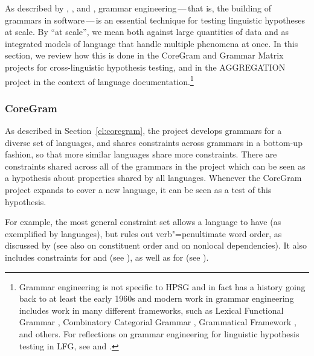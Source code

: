 \documentclass[output=paper
	        ,collection
	        ,collectionchapter
 	        ,biblatex
                ,babelshorthands
                ,newtxmath
                ,draftmode
                ,colorlinks, citecolor=brown
]{langscibook}
\begin{document}

As described by \citet[]{Mueller99a}, \citet{Bender2008c}, and \citet{BFO2011a-u},
grammar engineering\,---\,that is, the building of grammars in software\,---\,is
an essential technique for testing linguistic hypotheses at scale. By
``at scale'', we mean both against large quantities of data and as
integrated models of language that handle multiple phenomena at
once. In this section, we review how this is done in the CoreGram
and Grammar Matrix projects for cross-linguistic hypothesis testing,
and in the AGGREGATION project in the context of language
documentation.\footnote{Grammar engineering is not specific to HPSG and
in fact has a history going back to at least the early 1960s \citep{Kay:63,ZFHW65a,Petrick65a-u,FBDPM71a-u}
and modern work in grammar engineering includes work in many different frameworks, such as Lexical Functional Grammar \citep{BKNS99a-ed}, Combinatory Categorial
Grammar \citep{BCPW2007a}, Grammatical Framework \citep{Ranta:09}, and others.
For reflections on grammar engineering for linguistic hypothesis testing
in LFG, see \citet{BKNS99a-ed} and \citet{King:16}.}



\subsubsection{CoreGram}
\label{cl:lang-doc:coregram}

As described in Section~\ref{cl:coregram},
the  project develops grammars for a diverse set of languages,
and shares constraints across grammars in a bottom-up fashion, so that more
similar languages share more constraints. There are constraints
shared across all of the grammars in the project which can be seen
as a hypothesis about properties shared by all languages.
Whenever the CoreGram project expands to cover a new language,
it can be seen as a test of this hypothesis.

For example, the most general constraint set
allows a language to have 
(as exemplified by  languages),
but rules out verb"=penultimate word order,
as discussed by \citet[--46]{MuellerCoreGram}
(see also  on constituent order and  on nonlocal dependencies).
It also includes constraints for  and 
(see ),
as well as for 
(see ).
\end{document}
